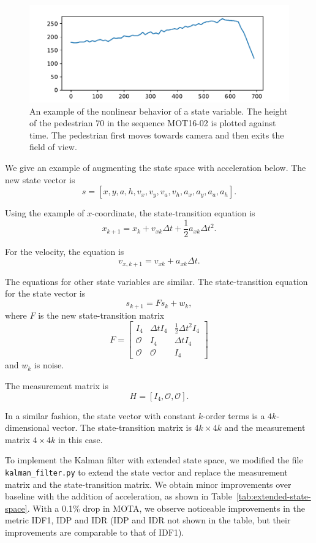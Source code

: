 \documentclass[conference]{IEEEtran}
\begin{document}
\begin{figure}[h]
    \centering
    \includegraphics[width=\linewidth]{fig/accelerating-pedestrian-height-plot.pdf}
    \caption{An example of the nonlinear behavior of a state variable. The height of the pedestrian 70 in the sequence MOT16-02 is plotted against time. The pedestrian first moves towards camera and then exits the field of view.}
    \label{fig:example-of-nonlinearity}
\end{figure}

We give an example of augmenting the state space with acceleration below. The new state vector is
\[
    s = [x, y, a, h, v_x, v_y, v_a, v_h, a_x, a_y, a_a, a_h].
\]

Using the example of $x$-coordinate, the state-transition equation is
\[
    x_{k + 1} = x_k + v_{xk} \Delta t + \frac{1}{2} a_{xk} \Delta t^2.
\]

For the velocity, the equation is
\[
    v_{x, k + 1} = v_{xk} + a_{xk} \Delta t.
\]

The equations for other state variables are similar. The state-transition equation for the state vector is
\[
    s_{k + 1} = Fs_k + w_k,
\]
where $F$ is the new state-transition matrix
\[
    F = \begin{bmatrix}
        I_4 & \Delta t I_4 & \frac{1}{2} \Delta t^2 I_4\\
        \mathcal{O} & I_4 & \Delta t I_4\\
        \mathcal{O} & \mathcal{O} & I_4
    \end{bmatrix}
\]
and $w_k$ is noise.

The measurement matrix is
\[
    H = [I_4, \mathcal{O}, \mathcal{O}].
\]

In a similar fashion, the state vector with constant $k$-order terms is a $4k$-dimensional vector. The state-transition matrix is $4k \times 4k$ and the measurement matrix $4 \times 4k$ in this case.

To implement the Kalman filter with extended state space, we modified the file \texttt{kalman\_filter.py} to extend the state vector and replace the measurement matrix and the state-transition matrix. We obtain minor improvements over baseline with the addition of acceleration, as shown in Table~\ref{tab:extended-state-space}. With a 0.1\% drop in MOTA, we observe noticeable improvements in the metric IDF1, IDP and IDR (IDP and IDR not shown in the table, but their improvements are comparable to that of IDF1).
\end{document}
